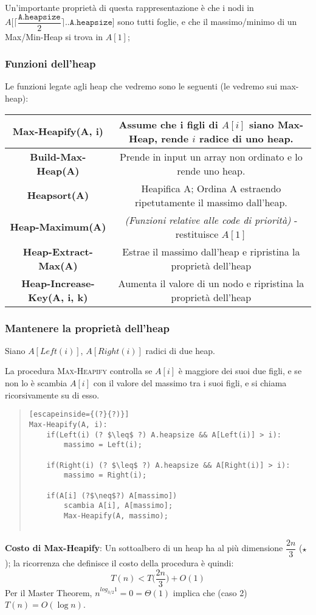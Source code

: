 \documentclass[a4paper,10pt]{article}
\theoremstyle{definition}
\begin{document}
Un'importante proprietà di questa rappresentazione è che i nodi in $A \bigg[\bigg\lceil \dfrac{\texttt{A.heapsize}}{2} \bigg\rceil  .. \texttt{A.heapsize}\bigg]$ sono tutti foglie, e che il massimo/minimo di un Max/Min-Heap si trova in $A[1]$;

\subsubsection{Funzioni dell'heap}
Le funzioni legate agli heap che vedremo sono le seguenti (le vedremo sui max-heap):

\begin{center}
\def\arraystretch{1.5}%
 \begin{tabular}{|c|c|}
 \hline
 \textbf{Max-Heapify(A, i)} & Assume che i figli di $A[i]$ siano Max-Heap, rende $i$ radice di uno heap.\\
 \hline
 \textbf{Build-Max-Heap(A)} & Prende in input un array non ordinato e lo rende uno heap.\\
 \hline
 \textbf{Heapsort(A)} & Heapifica A; Ordina A estraendo ripetutamente il massimo dall'heap.\\
 \hline
 \textbf{Heap-Maximum(A)}& \emph{(Funzioni relative alle code di priorità)} - restituisce $A[1]$\\ 
 \textbf{Heap-Extract-Max(A)}& Estrae il massimo dall'heap e ripristina la proprietà dell'heap\\
 \textbf{Heap-Increase-Key(A, i, k)}& Aumenta il valore di un nodo e ripristina la proprietà dell'heap\\
 \hline
\end{tabular}
\end{center}
\newpage
\subsubsection{Mantenere la proprietà dell'heap}
Siano $A[Left(i)]$, $A[Right(i)]$ radici di due heap. \smallskip

La procedura \textsc{Max-Heapify} controlla se $A[i]$ è maggiore dei suoi due figli, e se non lo è scambia $A[i]$ con il valore del massimo tra i suoi figli, e si chiama ricorsivamente su di esso.
\begin{quote}
\begin{lstlisting}[escapeinside={(?}{?)}]
Max-Heapify(A, i):
    if(Left(i) (? $\leq$ ?) A.heapsize && A[Left(i)] > i): 
        massimo = Left(i);
        
    if(Right(i) (? $\leq$ ?) A.heapsize && A[Right(i)] > i): 
        massimo = Right(i);
        
    if(A[i] (?$\neq$?) A[massimo]) 
        scambia A[i], A[massimo];
        Max-Heapify(A, massimo);
    
\end{lstlisting}
\end{quote}
\textbf{Costo di Max-Heapify}:
Un sottoalbero di un heap ha al più dimensione $\dfrac{2n}{3}$ ($\star$); la ricorrenza che definisce il costo della procedura è quindi:
\[T(n) < T\bigg(\dfrac{2n}{3}\bigg) + O(1)\]
Per il Master Theorem, $n^{log_{3/2} 1} = 0 = \Theta(1)$ implica che (caso 2) $T(n) = O(\log n) $.
\smallskip
\end{document}
